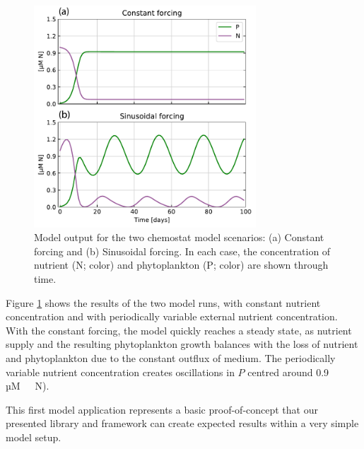 \documentclass[journal abbreviation, manuscript]{copernicus}
\begin{document}
\begin{figure}[t]
\includegraphics[width=8.3cm]{Figures/firstdraft_plots/01_chemostat_output.pdf}
\caption{Model output for the two chemostat model scenarios: (a) Constant forcing and (b) Sinusoidal forcing. In each case, the concentration of nutrient (N; color) and phytoplankton (P; color) are shown through time.}
\label{Figure:ResultsChemostat}
\end{figure}

Figure \ref{Figure:ResultsChemostat} shows the results of the two model runs, with constant nutrient concentration and with periodically variable external nutrient concentration. With the constant forcing, the model quickly reaches a steady state, as nutrient supply and the resulting phytoplankton growth balances with the loss of nutrient and phytoplankton due to the constant outflux of medium. The periodically variable nutrient concentration creates oscillations in $P$ centred around 0.9 \unit{µM \ N}).

This first model application represents a basic proof-of-concept that our presented library and framework can create expected results within a very simple model setup.
\end{document}

